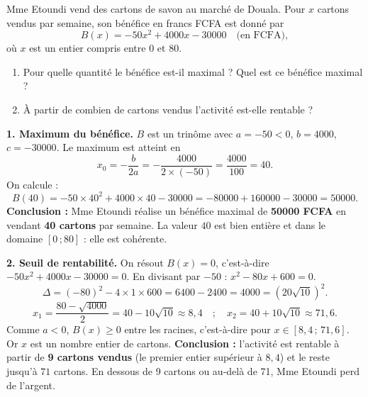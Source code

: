 \documentclass[11pt]{article}
\begin{document}
\begin{exoresolu}
Mme Etoundi vend des cartons de savon au marché de Douala. Pour $x$ cartons vendus par semaine, son bénéfice en francs FCFA est donné par
\[ B(x) = -50x^2 + 4000x - 30000 \quad \text{(en FCFA)}, \]
où $x$ est un entier compris entre $0$ et $80$.
\begin{enumerate}
\item Pour quelle quantité le bénéfice est-il maximal ? Quel est ce bénéfice maximal ?
\item À partir de combien de cartons vendus l'activité est-elle rentable ?
\end{enumerate}
\tcblower
\textbf{1. Maximum du bénéfice.} $B$ est un trinôme avec $a = -50 < 0$, $b = 4000$, $c = -30000$. Le maximum est atteint en
\[ x_0 = -\frac{b}{2a} = -\frac{4000}{2 \times (-50)} = \frac{4000}{100} = 40. \]
On calcule :
\[ B(40) = -50 \times 40^2 + 4000 \times 40 - 30000 = -80000 + 160000 - 30000 = 50000. \]
\textbf{Conclusion :} Mme Etoundi réalise un bénéfice maximal de \textbf{\num{50000} FCFA} en vendant \textbf{40 cartons} par semaine. La valeur $40$ est bien entière et dans le domaine $[0\,;80]$ : elle est cohérente.

\textbf{2. Seuil de rentabilité.} On résout $B(x) = 0$, c'est-à-dire $-50x^2 + 4000x - 30000 = 0$. En divisant par $-50$ : $x^2 - 80x + 600 = 0$.
\[ \Delta = (-80)^2 - 4 \times 1 \times 600 = 6400 - 2400 = 4000 = (20\sqrt{10})^2. \]
\[ x_1 = \frac{80 - \sqrt{4000}}{2} = 40 - 10\sqrt{10} \approx 8{,}4 \quad ; \quad x_2 = 40 + 10\sqrt{10} \approx 71{,}6. \]
Comme $a < 0$, $B(x) \geq 0$ entre les racines, c'est-à-dire pour $x \in [8{,}4\,;\,71{,}6]$. Or $x$ est un nombre entier de cartons.
\textbf{Conclusion :} l'activité est rentable à partir de \textbf{9 cartons vendus} (le premier entier supérieur à $8{,}4$) et le reste jusqu'à $71$ cartons. En dessous de 9 cartons ou au-delà de 71, Mme Etoundi perd de l'argent.
\end{exoresolu}
\end{document}
